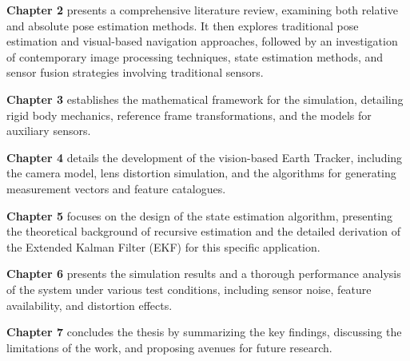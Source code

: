\noindent
\textbf{Chapter 2} presents a comprehensive literature review, examining both relative and absolute pose estimation methods. It then explores traditional pose estimation
and visual-based navigation approaches, followed by an investigation of contemporary image processing techniques, state estimation methods, and sensor fusion strategies 
involving traditional sensors.
\vspace{0.5cm}

\noindent
\textbf{Chapter 3} establishes the mathematical framework for the simulation, detailing rigid body mechanics, reference frame transformations, and the models for auxiliary sensors.
\vspace{0.5cm}

\noindent
\textbf{Chapter 4} details the development of the vision-based Earth Tracker, including the camera model, lens distortion simulation, and the algorithms for generating measurement vectors and feature catalogues.
\vspace{0.5cm}

\noindent
\textbf{Chapter 5} focuses on the design of the state estimation algorithm, presenting the theoretical background of recursive estimation and the detailed derivation of the Extended Kalman Filter (EKF) for this specific application.
\vspace{0.5cm}

\noindent
\textbf{Chapter 6} presents the simulation results and a thorough performance analysis of the system under various test conditions, including sensor noise, feature availability, and distortion effects.
\vspace{0.5cm}

\noindent
\textbf{Chapter 7} concludes the thesis by summarizing the key findings, discussing the limitations of the work, and proposing avenues for future research.
\vspace{0.5cm}